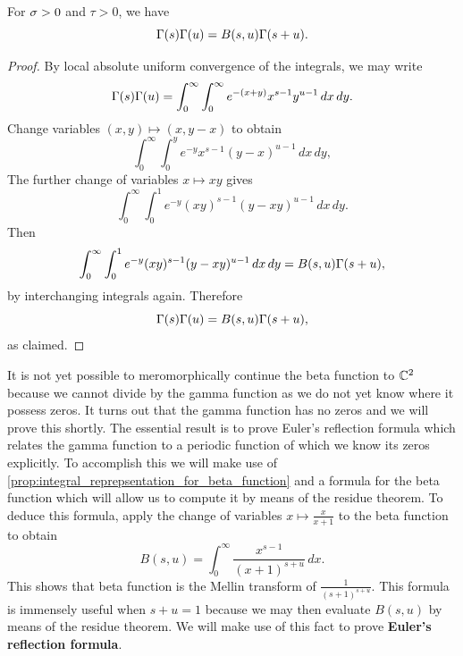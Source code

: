     \begin{proposition}\label{prop:integral_reprepsentation_for_beta_function}
      For \(\sigma > 0\) and \(\tau > 0\), we have
      \[
        \Gamma(s)\Gamma(u) = B(s,u)\Gamma(s+u).
      \]
    \end{proposition}
    \begin{proof}
      By local absolute uniform convergence of the integrals, we may write
      \[
        \Gamma(s)\Gamma(u) = \int_{0}^{\infty}\int_{0}^{\infty}e^{-(x+y)}x^{s-1}y^{u-1}\,dx\,dy.
      \]
      Change variables \((x,y) \mapsto (x,y-x)\) to obtain
      \[
        \int_{0}^{\infty}\int_{0}^{y}e^{-y}x^{s-1}(y-x)^{u-1}\,dx\,dy,
      \]
      The further change of variables \(x \mapsto xy\) gives
      \[
        \int_{0}^{\infty}\int_{0}^{1}e^{-y}(xy)^{s-1}(y-xy)^{u-1}\,dx\,dy.
      \]
      Then
      \[
        \int_{0}^{\infty}\int_{0}^{1}e^{-y}(xy)^{s-1}(y-xy)^{u-1}\,dx\,dy = B(s,u)\Gamma(s+u),
      \]
      by interchanging integrals again. Therefore
      \[
        \Gamma(s)\Gamma(u) = B(s,u)\Gamma(s+u),
      \]
      as claimed.
    \end{proof}

    It is not yet possible to meromorphically continue the beta function to \(\mathbb{C}^{2}\) because we cannot divide by the gamma function as we do not yet know where it possess zeros. It turns out that the gamma function has no zeros and we will prove this shortly. The essential result is to prove Euler's reflection formula which relates the gamma function to a periodic function of which we know its zeros explicitly. To accomplish this we will make use of \cref{prop:integral_reprepsentation_for_beta_function} and a formula for the beta function which will allow us to compute it by means of the residue theorem. To deduce this formula, apply the change of variables \(x \mapsto \frac{x}{x+1}\) to the beta function to obtain
    \begin{equation}\label{equ:residue_form_beta_function}
      B(s,u) = \int_{0}^{\infty}\frac{x^{s-1}}{(x+1)^{s+u}}\,dx.
    \end{equation}
    This shows that beta function is the Mellin transform of \(\frac{1}{(s+1)^{s+u}}\). This formula is immensely useful when \(s+u = 1\) because we may then evaluate \(B(s,u)\) by means of the residue theorem. We will make use of this fact to prove \textbf{Euler's reflection formula}.

